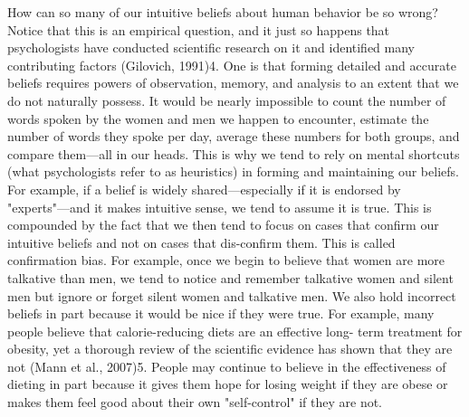 
How can so many of our intuitive beliefs about human behavior be so wrong? Notice that this is an empirical question, and it just so happens that psychologists have conducted scientific research on it and identified many contributing factors (Gilovich, 1991)4. One is that forming detailed and accurate beliefs requires powers of observation, memory, and analysis to an extent that we do not naturally possess. It would be nearly impossible to count the number of words spoken by the women and men we happen to encounter, estimate the number of words they spoke per day, average these numbers for both groups, and compare them---all in our heads. This is why we tend to rely on mental shortcuts (what psychologists refer to as heuristics) in forming and maintaining our beliefs. For example, if a belief is widely shared---especially if it is endorsed by "experts"---and it makes intuitive sense, we tend to assume it is true. This is compounded by the fact that we then tend to focus on cases that confirm our intuitive beliefs and not on cases that dis-confirm them. This is called confirmation bias. For example, once we begin to believe that women are more talkative than men, we tend to notice and remember talkative women and silent men but ignore or forget silent women and talkative men. We also hold incorrect beliefs in part because it would be nice if they were true. For example, many people believe that calorie-reducing diets are an effective long- term treatment for obesity, yet a thorough review of the scientific evidence has shown that they are not (Mann et al., 2007)5. People may continue to believe in the effectiveness of dieting in part because it gives them hope for losing weight if they are obese or makes them feel good about their own "self-control" if they are not.


